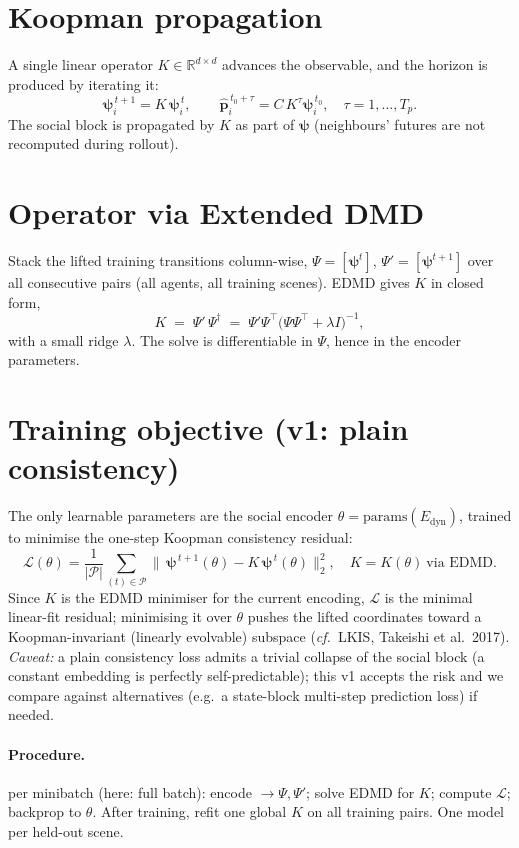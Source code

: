 \documentclass[11pt]{article}
\newcommand{\R}{\mathbb{R}}
\newcommand{\pos}{\mathbf{p}}
\newcommand{\psib}{\bm{\psi}}
\newcommand{\Kop}{K}
\begin{document}
\section{Koopman propagation}
A single linear operator $\Kop\in\R^{d\times d}$ advances the observable, and the
horizon is produced by iterating it:
\[
  \psib_i^{\,t+1}=\Kop\,\psib_i^{\,t},
  \qquad
  \hat{\pos}_i^{\,t_0+\tau}=C\,\Kop^{\tau}\psib_i^{\,t_0},\quad \tau=1,\dots,T_p.
\]
The social block is propagated by $\Kop$ as part of $\psib$ (neighbours' futures
are not recomputed during rollout).

\section{Operator via Extended DMD}
Stack the lifted training transitions column-wise, $\Psi=[\psib^{t}]$,
$\Psi'=[\psib^{t+1}]$ over all consecutive pairs (all agents, all training
scenes). EDMD gives $\Kop$ in closed form,
\[
  \Kop \;=\; \Psi'\,\Psi^{\dagger}
  \;=\; \Psi'\Psi^{\top}\big(\Psi\Psi^{\top}+\lambda I\big)^{-1},
\]
with a small ridge $\lambda$. The solve is differentiable in $\Psi$, hence in the
encoder parameters.

\section{Training objective (v1: plain consistency)}
The only learnable parameters are the social encoder
$\theta=\text{params}(E_{\text{dyn}})$, trained to minimise the one-step Koopman
consistency residual:
\[
  \boxed{\;
  \mathcal{L}(\theta)=\frac{1}{|\mathcal{P}|}\sum_{(t)\in\mathcal{P}}
  \big\lVert\,\psib^{\,t+1}(\theta)-\Kop\,\psib^{\,t}(\theta)\big\rVert_2^2,
  \quad \Kop=\Kop(\theta)\ \text{via EDMD}.\;}
\]
Since $\Kop$ is the EDMD minimiser for the current encoding, $\mathcal{L}$ is the
minimal linear-fit residual; minimising it over $\theta$ pushes the lifted
coordinates toward a Koopman-invariant (linearly evolvable) subspace
(\emph{cf.}\ LKIS, Takeishi et al.\ 2017). \emph{Caveat:} a plain consistency
loss admits a trivial collapse of the social block (a constant embedding is
perfectly self-predictable); this v1 accepts the risk and we compare against
alternatives (e.g.\ a state-block multi-step prediction loss) if needed.

\paragraph{Procedure.} per minibatch (here: full batch): encode
$\to\Psi,\Psi'$; solve EDMD for $\Kop$; compute $\mathcal{L}$; backprop to
$\theta$. After training, refit one global $\Kop$ on all training pairs. One
model per held-out scene.
\end{document}
